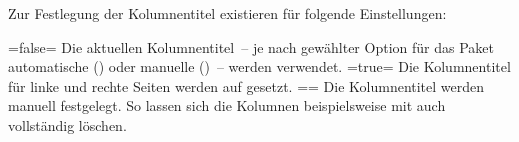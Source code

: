 \documentclass[english,ngerman,ToDo=inline,final,indexnote=false]{tudscrmanual}
\begin{document}
\begin{Declaration}
  {}
\begin{Declaration}
  {}
\printdeclarationlist
Zur Festlegung der Kolumnentitel existieren für 
folgende Einstellungen:%
\begin{DeclareValues}
\itemval=false=
  Die aktuellen Kolumnentitel~-- je nach gewählter Option für das Paket 
   automatische () oder manuelle 
  ()~-- werden verwendet.
\itemval*=true=
  Die Kolumnentitel für linke und rechte Seiten werden auf  
  gesetzt.
\itemval==
  Die Kolumnentitel werden manuell festgelegt. So lassen sich die Kolumnen 
  beispielsweise mit  auch 
  vollständig löschen. 
\end{DeclareValues}
\end{Declaration}
\end{Declaration}
\end{document}
